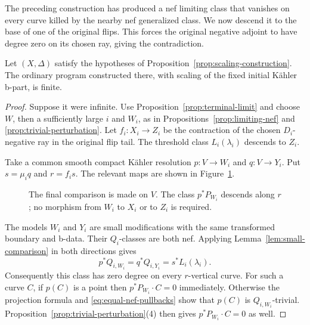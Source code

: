The preceding construction has produced a nef limiting class that
vanishes on every curve killed by the nearby nef generalized class.
We now descend it to the base of one of the original flips.  This
forces the original negative adjoint to have degree zero on its
chosen ray, giving the contradiction.

\begin{proposition}
\label{prop:scaling-finite}
Let $(X,\Delta)$ satisfy the hypotheses of
Proposition~\ref{prop:scaling-construction}.  The ordinary program
constructed there, with scaling of the fixed initial Kähler b-part,
is finite.
\end{proposition}

\begin{proof}
Suppose it were infinite.  Use Proposition~\ref{prop:terminal-limit}
and choose $W$, then a sufficiently large $i$ and $W_i$, as in
Propositions~\ref{prop:limiting-nef} and
\ref{prop:trivial-perturbation}.  Let $f_i:X_i\to Z_i$ be the
contraction of the chosen $D_i$-negative ray in the original flip
tail.  The threshold class $L_i(\lambda_i)$ descends to $Z_i$.

Take a common smooth compact Kähler resolution
$p:V\to W_i$ and $q:V\to Y_i$.  Put
$s=\mu_iq$ and $r=f_is$.  The relevant maps are shown in
Figure~\ref{fig:perturbation-descent}.
\begin{figure}[htbp]
 \centering
 \caption{The final comparison is made on $V$.
 The class $p^*P_{W_i}$ descends along $r$; no morphism from $W_i$
 to $X_i$ or to $Z_i$ is required.}
 \label{fig:perturbation-descent}
\end{figure}

The models $W_i$ and $Y_i$ are small modifications with the same
transformed boundary and b-data.  Their $Q_i$-classes are both nef.
Applying Lemma~\ref{lem:small-comparison} in both directions gives
\begin{equation}
 p^*Q_{i,W_i}=q^*Q_{i,Y_i}
            =s^*L_i(\lambda_i).
 \label{eq:equal-nef-pullbacks}
\end{equation}
Consequently this class has zero degree on every $r$-vertical curve.
For such a curve $C$, if $p(C)$ is a point then
$p^*P_{W_i}\cdot C=0$ immediately.  Otherwise the projection formula
and \eqref{eq:equal-nef-pullbacks} show that $p(C)$ is
$Q_{i,W_i}$-trivial.  Proposition~\ref{prop:trivial-perturbation}(4)
then gives $p^*P_{W_i}\cdot C=0$ as well.


\end{proof}
